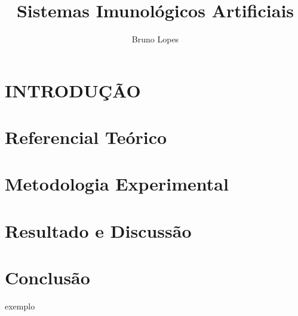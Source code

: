 \documentclass[conference]{IEEEtran}
\begin{document}
\title{Sistemas Imunológicos Artificiais}

\author{Bruno Lopes}
\maketitle

\begin{abstract}


\end{abstract}

\vspace*{1cm}
\section{INTRODUÇÃO}

\vspace*{1cm}
\section{Referencial Teórico}
	
    
\section{Metodologia Experimental}
    
 
\section{Resultado e Discussão}

   
\section*{Conclusão}


\begin{thebibliography}{00}

 exemplo
\end{thebibliography}
\end{document}
